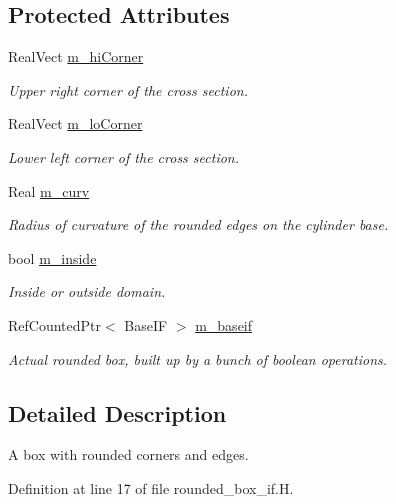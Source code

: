 \subsection*{Protected Attributes}
\begin{DoxyCompactItemize}
\item 
Real\+Vect \hyperlink{classrounded__box__if_ab98867b89d6efc596c1dd7e6436076f2}{m\+\_\+hi\+Corner}
\begin{DoxyCompactList}\small\item\em Upper right corner of the cross section. \end{DoxyCompactList}\item 
Real\+Vect \hyperlink{classrounded__box__if_a003b9c5a95dec4837a7f080385b2a70c}{m\+\_\+lo\+Corner}
\begin{DoxyCompactList}\small\item\em Lower left corner of the cross section. \end{DoxyCompactList}\item 
Real \hyperlink{classrounded__box__if_a488e9171cb2e146a87ae4cd8250c9827}{m\+\_\+curv}
\begin{DoxyCompactList}\small\item\em Radius of curvature of the rounded edges on the cylinder base. \end{DoxyCompactList}\item 
bool \hyperlink{classrounded__box__if_ab7b1242564fcc136597c886d631eeca8}{m\+\_\+inside}
\begin{DoxyCompactList}\small\item\em Inside or outside domain. \end{DoxyCompactList}\item 
Ref\+Counted\+Ptr$<$ Base\+IF $>$ \hyperlink{classrounded__box__if_a558ccabb874f89e379a7239a7a7dd292}{m\+\_\+baseif}
\begin{DoxyCompactList}\small\item\em Actual rounded box, built up by a bunch of boolean operations. \end{DoxyCompactList}\end{DoxyCompactItemize}


\subsection{Detailed Description}
A box with rounded corners and edges. 

Definition at line 17 of file rounded\+\_\+box\+\_\+if.\+H.



